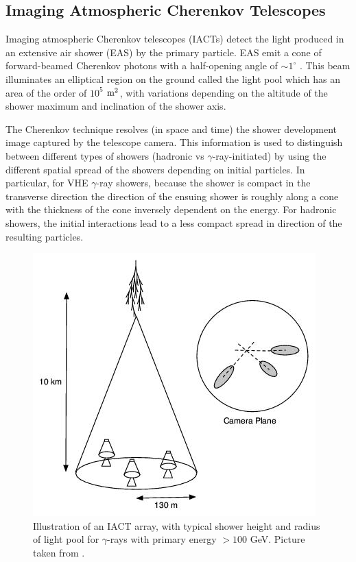 \documentclass[main.tex]{subfiles}
\begin{document}
\subsection{Imaging Atmospheric Cherenkov Telescopes}
Imaging atmospheric Cherenkov telescopes (IACTs) detect the light produced in an extensive air shower (EAS) by the primary particle. EAS emit a cone of forward-beamed Cherenkov photons with a half-opening angle of $\sim 1^\circ$ \cite{antonelli2009}. This beam illuminates an elliptical region on the ground called the light pool which has an area of the order of $10^5$ $\textrm{m}^2$, with variations depending on the altitude of the shower maximum and inclination of the shower axis. \par
The Cherenkov technique resolves (in space and time) the shower development image captured by the telescope camera. This information is used to distinguish between different types of showers (hadronic vs $\gamma$-ray-initiated) by using the different spatial spread of the showers depending on initial particles. In particular, for VHE $\gamma$-ray showers, because the shower is compact in the transverse direction the direction of the ensuing shower is roughly along a cone with the thickness of the cone inversely dependent on the energy.%
 For hadronic showers, the initial interactions lead to a less compact spread in direction of the resulting particles.\par
\begin{figure}[htbp]
  \centering
  \includegraphics[width=0.68\linewidth]{images/IACT}
  \caption[Illustration of an IACT array.]{Illustration of an IACT array, with typical shower height and radius of light pool for $\gamma$-rays with primary energy $>100$ GeV. Picture taken from \cite{veritas_web}.}
  \label{fig:IACT}
\end{figure}
\end{document}
